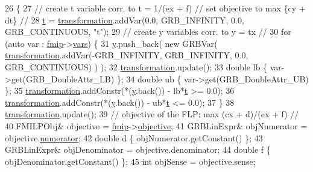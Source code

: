 \begin{DoxyCode}
26  \{
27   \textcolor{comment}{// create t variable corr. to t = 1/(ex + f) // set objective to max \{cy + dt\} //}
28   \hyperlink{classgrbfrc_1_1CharnesCooper_a8e03048a467411b2147ef10acad3ff4f}{t} = \hyperlink{classgrbfrc_1_1CharnesCooper_a9107f891576f27501e5f103dca964359}{transformation}.addVar(0.0, GRB\_INFINITY, 0.0, GRB\_CONTINUOUS, \textcolor{stringliteral}{"t"});
29   \textcolor{comment}{// create y variables corr. to y = tx //}
30   \textcolor{keywordflow}{for} (\textcolor{keyword}{auto} var : \hyperlink{classgrbfrc_1_1CharnesCooper_a107817ee13698551fae6263c8849f730}{fmip}->\hyperlink{classgrbfrc_1_1FMILP_acbf6866651d8b8b18c094302cf2a4284}{vars}) \{
31         \hyperlink{classgrbfrc_1_1CharnesCooper_a19e3874ce0b6242d4b7f8491bfae472f}{y}.push\_back( \textcolor{keyword}{new} GRBVar( \hyperlink{classgrbfrc_1_1CharnesCooper_a9107f891576f27501e5f103dca964359}{transformation}.addVar(-GRB\_INFINITY, GRB\_INFINITY, 0.0, 
      GRB\_CONTINUOUS) ) );
32         \hyperlink{classgrbfrc_1_1CharnesCooper_a9107f891576f27501e5f103dca964359}{transformation}.update();
33         \textcolor{keywordtype}{double} lb \{ var->get(GRB\_DoubleAttr\_LB) \};
34         \textcolor{keywordtype}{double} ub \{ var->get(GRB\_DoubleAttr\_UB) \};
35         \hyperlink{classgrbfrc_1_1CharnesCooper_a9107f891576f27501e5f103dca964359}{transformation}.addConstr(*(\hyperlink{classgrbfrc_1_1CharnesCooper_a19e3874ce0b6242d4b7f8491bfae472f}{y}.back()) - lb*\hyperlink{classgrbfrc_1_1CharnesCooper_a8e03048a467411b2147ef10acad3ff4f}{t} >= 0.0);
36         \hyperlink{classgrbfrc_1_1CharnesCooper_a9107f891576f27501e5f103dca964359}{transformation}.addConstr(*(\hyperlink{classgrbfrc_1_1CharnesCooper_a19e3874ce0b6242d4b7f8491bfae472f}{y}.back()) - ub*\hyperlink{classgrbfrc_1_1CharnesCooper_a8e03048a467411b2147ef10acad3ff4f}{t} <= 0.0);
37   \}
38   \hyperlink{classgrbfrc_1_1CharnesCooper_a9107f891576f27501e5f103dca964359}{transformation}.update();
39   \textcolor{comment}{// objective of the FLP: max (cx + d)/(ex + f) //}
40   FMILPObj& objective = \hyperlink{classgrbfrc_1_1CharnesCooper_a107817ee13698551fae6263c8849f730}{fmip}->\hyperlink{classgrbfrc_1_1FMILP_a8807cc16614684fd6053b44dcd65657c}{objective};
41   GRBLinExpr& objNumerator = objective.\hyperlink{structgrbfrc_1_1FMILPObj_a01c26f8e99a6692909e562aa561c9274}{numerator};
42   \textcolor{keywordtype}{double} d \{ objNumerator.getConstant() \};
43   GRBLinExpr& objDenominator = objective.denominator;
44   \textcolor{keywordtype}{double} f \{ objDenominator.getConstant() \};
45   \textcolor{keywordtype}{int} objSense = objective.sense;

\end{DoxyCode}
